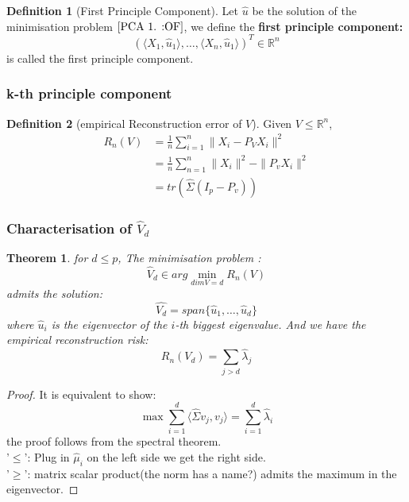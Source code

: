 \documentclass[a4paper,12pt, oneside, fleqn]{book}
\newtheorem{theorem}{Theorem}[section]
\theoremstyle{definition}
\newtheorem{definition}{Definition}[section]
\theoremstyle{remark}
\begin{document}
\begin{definition}[First Principle Component]
 Let $\hat{u}$ be the solution of the minimisation problem $\ref{PCA 1. :OF}$, we define the \textbf{first principle component:}
\begin{equation}\label{PCA 1.}
	(\langle X_1, \hat{u}_1 \rangle , \dots, \langle X_n, \hat{u}_1 \rangle)^T \in \mathbb{R}^n
\end{equation} 
is called the first principle component.
\end{definition}
 
 
\subsubsection*{k-th principle component}
\begin{definition}[empirical Reconstruction error of $V$]
Given $V \leq \mathbb{R}^n$, 
\begin{align*}
	R_n(V) 
		&= \frac{1}{n} \sum_{i = 1}^n \| X_i - P_V X_i \|^2\\
		&= \frac{1}{n} \sum_{n = 1}^n \|X_i\|^2 - \|P_v X_i\|^2\\
	 	&= tr(\hat{\Sigma}(I_p - P_v))
\end{align*}
\end{definition}








\subsubsection*{Characterisation of $\hat{V}_d$}

\begin{theorem}
	for $d \leq p$, The minimisation problem :
	\begin{equation}
		\hat{V}_d \in arg \min_{dim V = d} R_n(V)
	\end{equation}
	admits the solution:
	\begin{equation*}
		\hat{V_d} = span\{ \hat{u}_1, \dots, \hat{u}_d \} 
	\end{equation*}
	where $\hat{u}_i$ is the eigenvector of the $i$-th biggest eigenvalue. And we have the empirical reconstruction risk:
	\begin{equation}
		R_n (V_d) = \sum_{j > d } \hat{\lambda}_j
	\end{equation}
\end{theorem}

\begin{proof}
It is equivalent to show:
\begin{equation*}
	\max \sum_{i = 1}^d \langle \hat{\Sigma} v_j, v_j \rangle = \sum_{i = 1}^d \hat{\lambda}_i
\end{equation*}
the proof follows from the spectral theorem.\\
'$\leq$': Plug in $\hat{\mu}_i$ on the left side we get the right side. \\
'$\geq$': matrix scalar product(the norm has a name?) admits the maximum in the eigenvector.
\end{proof}
\end{document}
